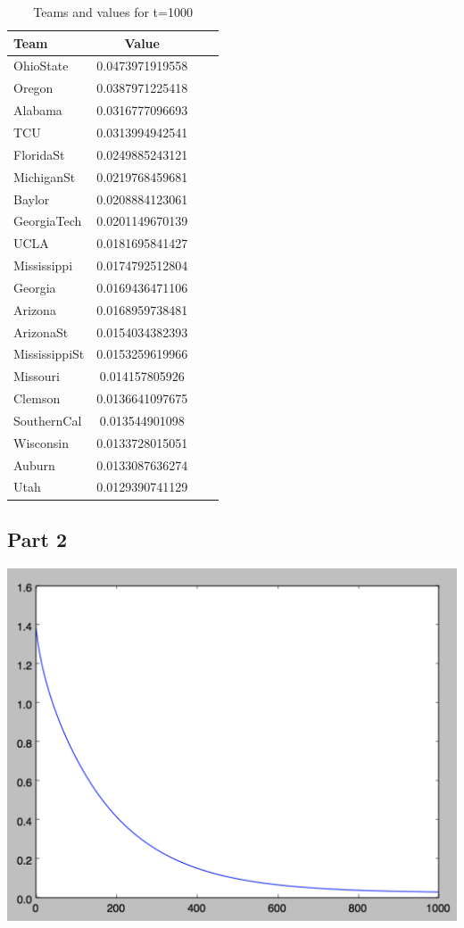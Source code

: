 \documentclass[11pt]{article}
\begin{document}
\begin{table}[!th]
\centering
\begin{tabular}{|l|c|cl}
\hline
Team & Value \\
\hline
OhioState & 0.0473971919558 \\
Oregon & 0.0387971225418 \\
Alabama & 0.0316777096693 \\
TCU & 0.0313994942541 \\
FloridaSt & 0.0249885243121 \\
MichiganSt & 0.0219768459681 \\
Baylor & 0.0208884123061 \\
GeorgiaTech & 0.0201149670139 \\
UCLA & 0.0181695841427 \\
Mississippi & 0.0174792512804 \\
Georgia & 0.0169436471106 \\
Arizona & 0.0168959738481 \\
ArizonaSt & 0.0154034382393 \\
MississippiSt & 0.0153259619966 \\
Missouri & 0.014157805926 \\
Clemson & 0.0136641097675 \\
SouthernCal & 0.013544901098 \\
Wisconsin & 0.0133728015051 \\
Auburn & 0.0133087636274 \\
Utah & 0.0129390741129 \\
\hline
\end{tabular}
\caption{Teams and values for t=1000}
\label{ex:table}
\end{table}

\subsection*{Part 2}

\includegraphics[scale=.5]{images/mm_eigdiff}
\end{document}
